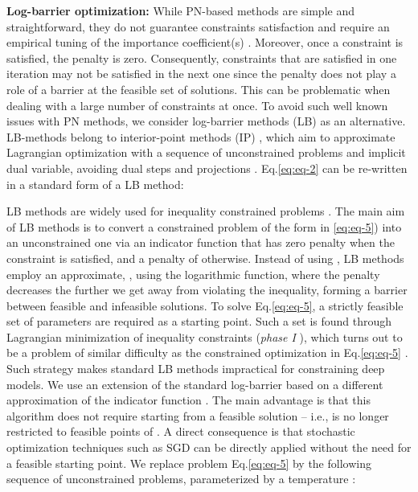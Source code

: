 \documentclass[8pt]{article}
\theoremstyle{definition}
\begin{document}
\textbf{Log-barrier optimization:}
While PN-based methods are simple and straightforward, they do not guarantee constraints satisfaction and require an empirical tuning of the importance coefficient(s) \citep{fletcher1987practical,gill1981practical}. Moreover, once a constraint is satisfied, the penalty is zero. Consequently, constraints that are satisfied in one iteration may not be satisfied in the next one since the penalty does not play a role of a barrier at the feasible set of solutions. This can be problematic when dealing with a large number of constraints at once. To avoid such well known issues with PN methods, we consider log-barrier methods (LB) as an alternative. LB-methods belong to interior-point methods (IP) \citep{boyd2004convex}, which aim to approximate Lagrangian optimization with a sequence of unconstrained problems and implicit dual variable, avoiding dual steps and projections \citep{boyd2004convex}.  Eq.\eqref{eq:eq-2} can be re-written in a standard form of a LB method:

LB methods are widely used for inequality constrained problems \citep{boyd2004convex}. The main aim of LB methods is to convert a constrained problem of the form in \eqref{eq:eq-5}) into an unconstrained one via an indicator function  that has zero penalty when the constraint is satisfied, and a penalty of  otherwise. Instead of using , LB methods employ an approximate, , using the logarithmic function, where the penalty decreases the further we get away from violating the inequality, forming a barrier between feasible and infeasible solutions. To solve Eq.\eqref{eq:eq-5}, a strictly feasible set of parameters  are required as a starting point. Such a set is found through Lagrangian minimization of inequality constraints (\emph{phase I} \citep{boyd2004convex}), which turns out to be a problem of similar difficulty as the constrained optimization in Eq.\eqref{eq:eq-5} \citep{boyd2004convex}. Such strategy makes standard LB methods impractical for constraining deep models. We use an extension of the standard log-barrier based on a different approximation of the indicator function \citep{kervadec2019log}. The main advantage is that this algorithm does not require starting from a feasible solution -- i.e.,  is no longer restricted to feasible points of . A direct consequence is that stochastic optimization techniques such as SGD can be directly applied without the need for a feasible starting point. We replace problem Eq.\eqref{eq:eq-5} by the following sequence of unconstrained problems, parameterized by a temperature :
\end{document}
